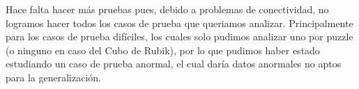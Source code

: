 \documentclass[a4paper,10pt]{article}
\begin{document}
    Hace falta hacer m\'as pruebas pues, debido a problemas de 
    conectividad, no logramos hacer todos los casos de prueba
    que queriamos analizar. Principalmente para los casos de prueba
    dif\'iciles, los cuales solo pudimos analizar uno por puzzle 
    (o ninguno en caso del Cubo de Rubik), por lo que pudimos
    haber estado estudiando un caso de prueba anormal, el cual 
    dar\'ia datos anormales no aptos para la generalizaci\'on. \\
    
    
\end{document}
